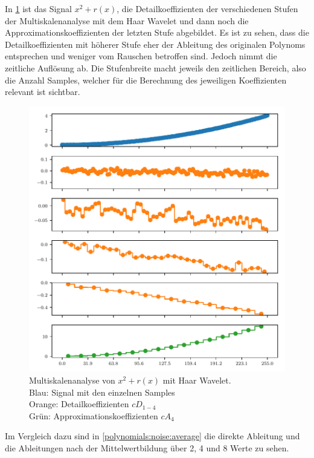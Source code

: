\begin{refsection}
In \cref{polynomials:noise:db1_multi} ist das Signal $x^2 + r(x)$, die
Detailkoeffizienten der verschiedenen Stufen der Multiskalenanalyse mit dem
Haar Wavelet und dann noch die Approximationskoeffizienten der letzten Stufe
abgebildet. Es ist zu sehen, dass die Detailkoeffizienten mit höherer Stufe
eher der Ableitung des originalen Polynoms entsprechen und weniger vom Rauschen
betroffen sind. Jedoch nimmt die zeitliche Auflösung ab.
Die Stufenbreite macht jeweils den zeitlichen Bereich, also die Anzahl Samples,
welcher für die Berechnung des jeweiligen Koeffizienten relevant ist sichtbar.
\begin{figure}
    \centering
    \includegraphics{papers/polynomials/images/polynomials_noise_db1_multi.pdf}
    \caption{Multiskalenanalyse von $x^2 + r(x)$ mit Haar Wavelet.\\
        Blau: Signal mit den einzelnen Samples\\
        Orange: Detailkoeffizienten $cD_{1-4}$ \\
        Grün: Approximationskoeffizienten $cA_4$\label{polynomials:noise:db1_multi}}
\end{figure}
Im Vergleich dazu sind in \cref{polynomials:noise:average} die direkte
Ableitung und die Ableitungen nach der Mittelwertbildung über 2, 4 und 8 Werte
zu sehen.


\end{refsection}
